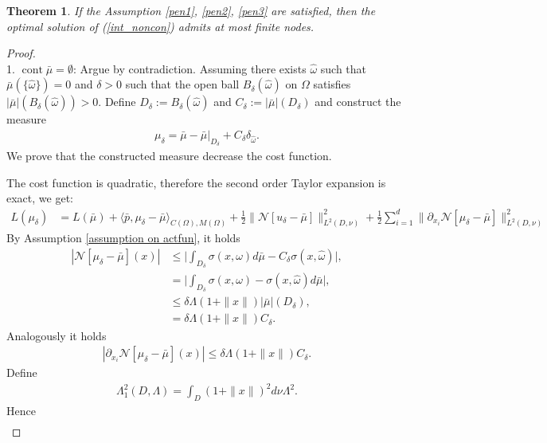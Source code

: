 \documentclass[12pt,fleqn]{amsart}
\newtheorem{theorem}{Theorem}[section]
\theoremstyle{definition}
\DeclareMathOperator*{\cont}{cont}
\begin{document}
\begin{theorem}
	If the Assumption \ref{pen1}, \ref{pen2}, \ref{pen3} are satisfied, then the optimal solution of (\ref{int_noncon}) admits at most finite nodes.
\end{theorem}
\begin{proof}\quad\\
1. $\cont\bar{\mu} = \emptyset$: Argue by contradiction. Assuming there exists $\hat{\omega}$ such that $\bar{\mu}(\{\hat{\omega}\}) = 0$ and $\delta > 0$ such that the open ball $B_\delta(\hat{\omega})$ on $\Omega$ satisfies $|\bar{\mu}|(B_\delta(\hat{\omega})) > 0$. 
Define $D_\delta := B_\delta(\hat{\omega})$ and $C_\delta := |\bar{\mu}|(D_\delta)$ and construct  the measure 
\begin{align*}
	\mu_\delta = \bar{\mu} - \bar{\mu}|_{D_\delta} + C_\delta \delta_{\hat{\omega}}. 
\end{align*}
We prove that the constructed measure decrease the cost function. \par
The cost function is quadratic, therefore the second order Taylor expansion is exact, we get:
\begin{align*}
	L(\mu_\delta)  &= L(\bar{\mu}) + \langle \bar{p}, \mu_\delta - \bar{\mu} \rangle_{C(\Omega), M(\Omega)} + \frac{1}{2} \|\mathcal{N}[u_\delta - \bar{\mu}]\|_{L^2(D, \nu)}^2 + \frac{1}{2}\sum_{i = 1}^d \|\partial_{x_i} \mathcal{N}[\mu_\delta - \bar{\mu}]\|_{L^2(D, \nu)}^2
\end{align*}
By Assumption \ref{assumption on actfun}, it holds
\begin{align*}
	 |\mathcal{N}[\mu_\delta - \bar{\mu}](x)| &\le \bigg|\int_{D_\delta} \sigma(x, \omega) d\bar{\mu} - C_\delta \sigma(x, \hat{\omega}) \bigg|,\\
	& = \bigg|\int_{D_\delta} \sigma(x, \omega)  - \sigma(x, \hat{\omega}) d \bar{\mu} \bigg|,\\
	& \le \delta \Lambda (1 + \|x\|)|\bar{\mu}|(D_\delta), \\
	& =  \delta \Lambda (1 + \|x\|)C_\delta. 
\end{align*}
Analogously it holds
\begin{align*}
	|\partial_{x_i} \mathcal{N}[\mu_\delta - \bar{\mu}](x)| \le \delta \Lambda (1 + \|x\|)C_\delta.
\end{align*}
Define 
\begin{align*}
	\Lambda_1^2(D, \Lambda) =  \int_D(1 + \|x\|)^2 d\nu  \Lambda^2.
\end{align*}
Hence
\begin{align*}

\end{align*}
\end{proof}
\end{document}
